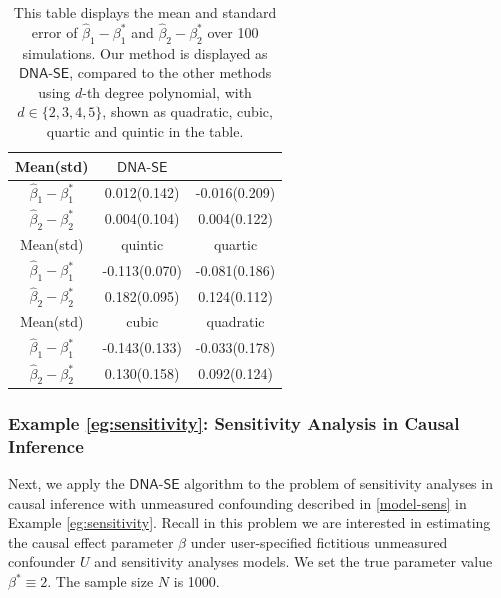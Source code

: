 \documentclass{article}
\def\dnase{{\mathsf{DNA\mbox{-}SE}}}
\theoremstyle{plain}
\theoremstyle{definition}
\theoremstyle{remark}
\def\hat{\widehat}
\begin{document}
\begin{table}[htbp]
\caption{This table displays the mean and standard error of $\hat{\beta}_1-\beta^{\ast}_1$ and $\hat{\beta}_2-\beta^{\ast}_2$ over 100 simulations. Our method is displayed as $\dnase$, compared to the other methods using $d$-th degree polynomial, with $d \in \{2,3,4,5\}$, shown as quadratic, cubic, quartic and quintic in the table.}
\label{table:simu_1}
\begin{center}
\begin{small}
\begin{sc}
\vskip 0.1in
\begin{tabular}{ccc}
\toprule
Mean(std)    & $\dnase$  & \citet{zhao2022versatile}  \\
\midrule
$\hat{\beta}_1 - \beta_1^\ast$ & 0.012(0.142) & -0.016(0.209)   \\ 
$\hat{\beta}_2 - \beta_2^\ast$  & 0.004(0.104) & 0.004(0.122)  \\
\toprule
Mean(std)  &   quintic & quartic \\
\midrule
$\hat{\beta}_1 - \beta_1^\ast$  & -0.113(0.070)& -0.081(0.186)   \\ 
$\hat{\beta}_2 - \beta_2^\ast$  & 0.182(0.095) & 0.124(0.112)   \\
\toprule
Mean(std)    &  cubic  & quadratic  \\
\midrule
$\hat{\beta}_1 - \beta_1^\ast$ & -0.143(0.133) & -0.033(0.178)   \\ 
$\hat{\beta}_2 - \beta_2^\ast$   & 0.130(0.158) & 0.092(0.124)  \\
\bottomrule
\end{tabular}
\end{sc}
\end{small}
\end{center}
\end{table}

\subsubsection{Example \ref{eg:sensitivity}: Sensitivity Analysis in Causal Inference}
\label{sec:sensitivity}

Next, we apply the $\dnase$ algorithm to the problem of sensitivity analyses in causal inference with unmeasured confounding described in \eqref{model-sens} in Example \ref{eg:sensitivity}. Recall in this problem we are interested in estimating the causal effect parameter $\beta$ under user-specified fictitious unmeasured confounder $U$ and sensitivity analyses models. We set the true parameter value $\beta^{\ast} \equiv 2$. The sample size $N$ is 1000.
\end{document}
